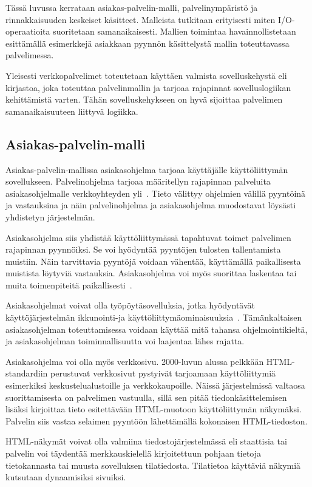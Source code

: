 \documentclass[finnish]{tktltiki2}
\theoremstyle{definition}
\theoremstyle{remark}
\begin{document}
Tässä luvussa kerrataan
asiakas-palvelin-malli, palvelinympäristö ja rinnakkaisuuden keskeiset käsitteet.
Malleista tutkitaan erityisesti miten I/O-operaatioita
suoritetaan samanaikaisesti. Mallien toimintaa havainnollistetaan
esittämällä esimerkkejä asiakkaan pyynnön käsittelystä mallin
toteuttavassa palvelimessa.

Yleisesti verkkopalvelimet toteutetaan käyttäen valmista sovelluskehystä eli kirjastoa,
joka toteuttaa palvelinmallin ja tarjoaa rajapinnat sovelluslogiikan
kehittämistä varten. Tähän sovelluskehykseen on hyvä sijoittaa
palvelimen samanaikaisuuteen liittyvä logiikka.

\subsection{Asiakas-palvelin-malli}
Asiakas-palvelin-mallissa
asiakasohjelma tarjoaa käyttäjälle käyttöliittymän sovellukseen. Palvelinohjelma
tarjoaa määritellyn rajapinnan
palveluita asiakasohjelmalle verkkoyhteyden yli~\cite{sinha_client-server_1992}.
Tieto välittyy ohjelmien välillä pyyntöinä ja vastauksina ja näin palvelinohjelma ja
asiakasohjelma
muodostavat löysästi yhdistetyn järjestelmän.

Asiakasohjelma siis yhdistää käyttöliittymässä tapahtuvat toimet palvelimen
rajapinnan pyynnöiksi. Se voi hyödyntää pyyntöjen tulosten tallentamista
muistiin. Näin tarvittavia pyyntöjä voidaan vähentää, käyttämällä
paikallisesta muistista löytyviä vastauksia.
Asiakasohjelma voi myös suorittaa
laskentaa tai muita toimenpiteitä paikallisesti~\cite{sinha_client-server_1992}.

Asiakasohjelmat voivat olla työpöytäsovelluksia, jotka hyödyntävät käyttöjärjestelmän
ikkunointi-ja käyttöliittymäominaisuuksia~\cite{sinha_client-server_1992}.
Tämänkaltaisen asiakasohjelman toteuttamisessa voidaan käyttää mitä tahansa ohjelmointikieltä,
ja asiakasohjelman toiminnallisuutta voi laajentaa lähes rajatta.

Asiakasohjelma voi olla myös verkkosivu. 2000-luvun alussa
pelkkään HTML-standardiin perustuvat verkkosivut pystyivät
tarjoamaan käyttöliittymiä esimerkiksi keskustelualustoille ja verkkokaupoille.
Näissä järjestelmissä valtaosa suorittamisesta on palvelimen vastuulla,
sillä sen pitää tiedonkäsittelemisen lisäksi kirjoittaa tieto
esitettävään HTML-muotoon käyttöliittymän näkymäksi. Palvelin
siis vastaa selaimen pyyntöön lähettämällä kokonaisen HTML-tiedoston.

HTML-näkymät voivat olla valmiina tiedostojärjestelmässä eli staattisia tai
palvelin voi täydentää merkkauskielellä kirjoitettuun pohjaan
tietoja tietokannasta tai muusta sovelluksen tilatiedosta. 
Tilatietoa käyttäviä näkymiä kutsutaan dynaamisiksi sivuiksi.
\end{document}
